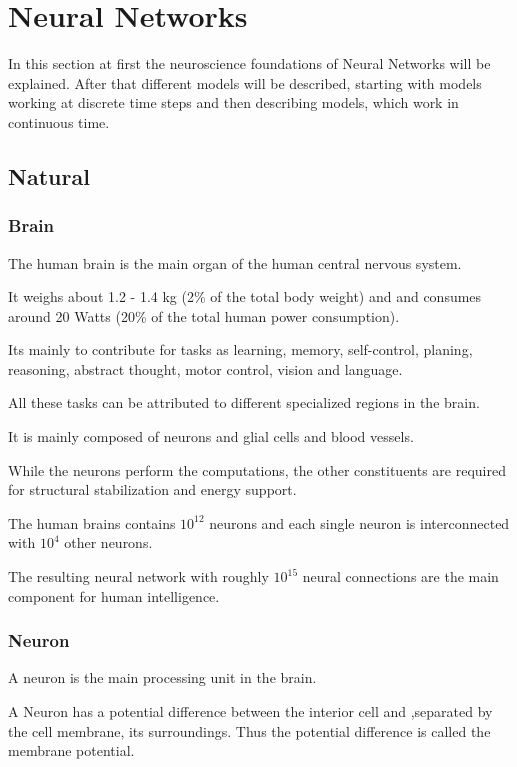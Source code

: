 \section{Neural Networks}

In this section at first the neuroscience foundations of Neural Networks will be explained.
After that different models will be described, starting with models working at discrete time steps and then describing models, which work in continuous time.

\subsection{Natural}
\subsubsection{Brain}

The human brain is the main organ of the human central nervous system.

It weighs about 1.2 - 1.4 kg (2\% of the total body weight) and and consumes around 20 Watts (20\% of the total human power consumption).

Its mainly to contribute for tasks as learning, memory, self-control, planing, reasoning, abstract thought, motor control, vision and language.

All these tasks can be attributed to different specialized regions in the brain. 

It is mainly composed of neurons and glial cells and blood vessels.

While the neurons perform the computations, the other constituents are required for structural stabilization and energy support.

The human brains contains $10^{12}$ neurons and each single neuron is interconnected with $10^{4}$ other neurons.

The resulting neural network with roughly $10^{15}$ neural connections are the main component for human intelligence.

\subsubsection{Neuron}


A neuron is the main processing unit in the brain.

A Neuron has a potential difference between the interior cell and ,separated by the cell membrane, its surroundings. 
Thus the potential difference is called the membrane potential.


